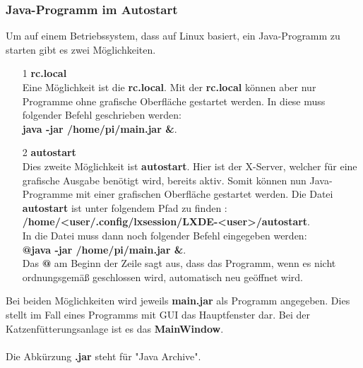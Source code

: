\subsubsection{Java-Programm im Autostart}\label{subsubsec:Autostart}
Um auf einem Betriebssystem, dass auf Linux basiert, ein Java-Programm zu starten gibt es zwei Möglichkeiten.
\begin{itemize}
\item[1] \textbf{rc.local}
\\ Eine Möglichkeit ist die \textbf{rc.local}. Mit der \textbf{rc.local} können aber nur Programme ohne grafische Oberfläche gestartet werden. In diese muss folgender Befehl geschrieben werden: 
\\ \textbf{java -jar /home/pi/main.jar \&}.
\item[2] \textbf{autostart}
\\ Dies zweite Möglichkeit ist \textbf{autostart}. Hier ist der X-Server, welcher für eine grafische Ausgabe benötigt wird, bereits aktiv. Somit können nun Java-Programme mit einer grafischen Oberfläche gestartet werden. Die Datei \textbf{autostart} ist unter folgendem Pfad zu finden : 
\\ \textbf{/home/<user/.config/lxsession/LXDE-<user>/autostart}. 
\\ In die Datei muss dann noch folgender Befehl eingegeben werden: 
\\ \textbf{@java -jar /home/pi/main.jar \&}.
\\Das \textbf{@} am Beginn der Zeile sagt aus, dass das Programm, wenn es nicht ordnungsgemäß geschlossen wird, automatisch neu geöffnet wird.
\end{itemize} 
Bei beiden Möglichkeiten wird jeweils \textbf{main.jar} als Programm angegeben. Dies stellt im Fall eines Programms mit \ac{GUI} das Hauptfenster dar. Bei der Katzenfütterungsanlage ist es das \textbf{MainWindow}.
\\ \\ Die Abkürzung \textbf{.jar} steht für "Java Archive".

\newpage

